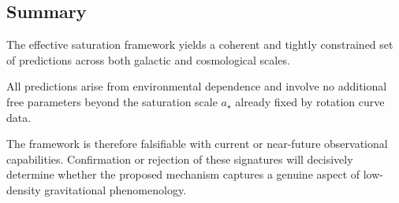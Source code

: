 \subsection{Summary}
  \label{subsec:predictions_summary}

  The effective saturation framework yields a coherent and tightly constrained
  set of predictions across both galactic and cosmological scales.

  All predictions arise from environmental dependence and involve no additional
  free parameters beyond the saturation scale $a_\star$ already fixed by rotation
  curve data.

  The framework is therefore falsifiable with current or near-future
  observational capabilities.
  Confirmation or rejection of these signatures will decisively determine
  whether the proposed mechanism captures a genuine aspect of low-density
  gravitational phenomenology.
